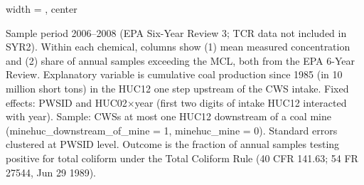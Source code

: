 \begin{table}[htbp]
\begin{adjustbox}{width = \textwidth, center}
      
   \end{adjustbox}
      {\tiny\linespread{1}\selectfont \par \raggedright 
   Sample period 2006--2008 (EPA Six-Year Review 3; TCR data not included in SYR2). Within each chemical, columns show (1) mean measured concentration and (2) share of annual samples exceeding the MCL, both from the EPA 6-Year Review. Explanatory variable is cumulative coal production since 1985 (in 10 million short tons) in the HUC12 one step upstream of the CWS intake. Fixed effects: PWSID and HUC02$\times$year (first two digits of intake HUC12 interacted with year). Sample: CWSs at most one HUC12 downstream of a coal mine (minehuc\_downstream\_of\_mine = 1, minehuc\_mine = 0). Standard errors clustered at PWSID level. Outcome is the fraction of annual samples testing positive for total coliform under the Total Coliform Rule (40 CFR 141.63; 54 FR 27544, Jun 29 1989).}
   
\end{table}


